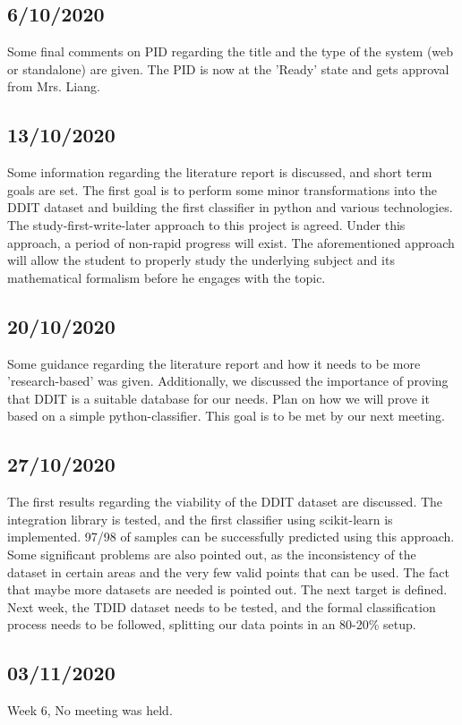 \documentclass[openany]{article}
\begin{document}
		\subsection{6/10/2020}
			Some final comments on PID regarding the title and the type of the system (web or standalone) are given. The PID is now at the 'Ready' state and gets approval from Mrs. Liang.
		\subsection{13/10/2020}
			Some information regarding the literature report is discussed, and short term goals are set. The first goal is to perform some minor transformations into the DDIT dataset and building the first classifier in python and various technologies. The study-first-write-later approach to this project is agreed. Under this approach, a period of non-rapid progress will exist. The aforementioned approach will allow the student to properly study the underlying subject and its mathematical formalism before he engages with the topic.
		\subsection{20/10/2020}
			Some guidance regarding the literature report and how it needs to be more 'research-based' was given. Additionally, we discussed the importance of proving that DDIT is a suitable database for our needs. Plan on how we will prove it based on a simple python-classifier. This goal is to be met by our next meeting.
		\subsection{27/10/2020}
			The first results regarding the viability of the DDIT dataset are discussed. The integration library is tested, and the first classifier using scikit-learn is implemented. 97/98 of samples can be successfully predicted using this approach. Some significant problems are also pointed out, as the inconsistency of the dataset in certain areas and the very few valid points that can be used. The fact that maybe more datasets are needed is pointed out. The next target is defined. Next week, the TDID dataset needs to be tested, and the formal classification process needs to be followed, splitting our data points in an 80-20\% setup.
		\subsection{03/11/2020}
			Week 6, No meeting was held.
\end{document}
